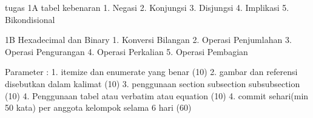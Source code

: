 tugas
1A
tabel kebenaran
1. Negasi
2. Konjungsi
3. Disjungsi
4. Implikasi
5. Bikondisional


1B 
Hexadecimal dan Binary
1. Konversi Bilangan
2. Operasi Penjumlahan
3. Operasi Pengurangan
4. Operasi Perkalian
5. Operasi Pembagian

Parameter :
1. itemize dan enumerate yang benar (10)
2. gambar dan referensi disebutkan dalam kalimat (10)
3. penggunaan section subsection subsubsection (10)
4. Penggunaan tabel atau verbatim atau equation (10)
4. commit sehari(min 50 kata) per anggota kelompok selama 6 hari (60)

